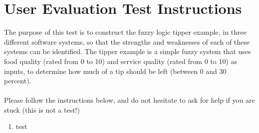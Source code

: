 \section{User Evaluation Test Instructions}
\label{app-userEval}
The purpose of this test is to construct the fuzzy logic tipper example, in three different software systems, so that the strengths and weaknesses of each of these systems can be identified. The tipper example is a simple fuzzy system that uses food quality (rated from 0 to 10) and service quality (rated from 0 to 10) as inputs, to determine how much of a tip should be left (between 0 and 30 percent). \ \\
\ \\
Please follow the instructions below, and do not hesitate to ask for help if you are stuck (this is not a test!)

\begin{enumerate}
\item test
\end{enumerate}
